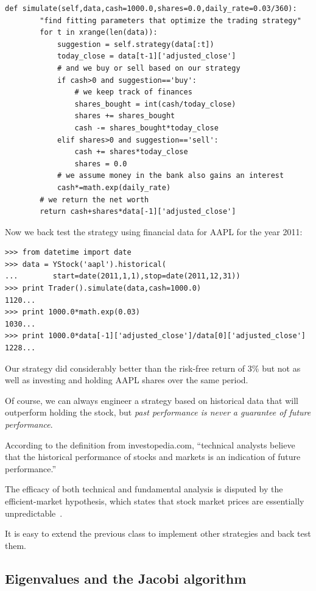 \documentclass[justified,sixbynine]{tufte-book}
\def\ft{\small\tt}
\theoremstyle{plain}%
\theoremstyle{definition}
\theoremstyle{remark}
\begin{document}
\begin{fullwidth}
\begin{lstlisting}[caption={in file: {\ft nlib.py}}]
    def simulate(self,data,cash=1000.0,shares=0.0,daily_rate=0.03/360):
        "find fitting parameters that optimize the trading strategy"
        for t in xrange(len(data)):
            suggestion = self.strategy(data[:t])
            today_close = data[t-1]['adjusted_close']
            # and we buy or sell based on our strategy
            if cash>0 and suggestion=='buy':
                # we keep track of finances
                shares_bought = int(cash/today_close)
                shares += shares_bought
                cash -= shares_bought*today_close
            elif shares>0 and suggestion=='sell':
                cash += shares*today_close
                shares = 0.0
            # we assume money in the bank also gains an interest
            cash*=math.exp(daily_rate)
        # we return the net worth
        return cash+shares*data[-1]['adjusted_close']
\end{lstlisting}

Now we back test the strategy using financial data for AAPL for the year 2011:

\begin{lstlisting}[caption={in file: {\ft nlib.py}}]
>>> from datetime import date
>>> data = YStock('aapl').historical(
...        start=date(2011,1,1),stop=date(2011,12,31))
>>> print Trader().simulate(data,cash=1000.0)
1120...
>>> print 1000.0*math.exp(0.03)
1030...
>>> print 1000.0*data[-1]['adjusted_close']/data[0]['adjusted_close']
1228...
\end{lstlisting}

Our strategy did considerably better than the risk-free return of 3\% but not as well as investing and holding AAPL shares over the same period.

Of course, we can always engineer a strategy based on historical data that will outperform holding the stock, but {\it past performance is never a guarantee of future performance}.

According to the definition from investopedia.com, ``technical analysts believe that the historical performance of stocks and markets is an indication of future performance.''

The efficacy of both technical and fundamental analysis is disputed by the efficient-market hypothesis, which states that stock market prices are essentially unpredictable~\cite{andrew}.

It is easy to extend the previous class to implement other strategies and back test them.

\goodbreak\subsection{Eigenvalues and the Jacobi algorithm}


\end{fullwidth}
\end{document}
